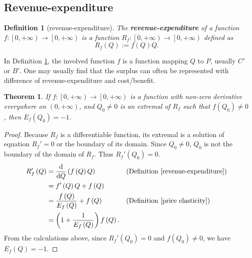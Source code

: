 \documentclass{article}
\newtheorem{theorem}{Theorem}[subsection]
\newtheorem{definition}{Definition}[subsection]
\begin{document}
\subsection{Revenue-expenditure}

\begin{definition}[revenue-expenditure]
\label{revenue-expenditure}
The \textbf{revenue-expenditure} of a function $f:\left[0,+\infty\right)\to\left[0,+\infty\right)$ is a function $R_f:\left[0,+\infty\right)\to\left[0,+\infty\right)$ defined as
$$R_f\left(Q\right):=f\left(Q\right)Q.$$
\end{definition}

In Definition \ref{revenue-expenditure}, the involved function $f$ is a function mapping $Q$ to $P$, usually $C'$ or $B'$.
One may usually find that the surplus can often be represented with difference of revenue-expenditure and cost/benefit.

\begin{theorem}
\label{price elasticity and revenue-expenditure}
If $f:\left[0,+\infty\right)\to\left[0,+\infty\right)$ is a function with non-zero derivative everywhere on $\left(0,+\infty\right)$, and $Q_0\ne0$ is an extremal of $R_f$ such that $f\left(Q_0\right)\ne0$, then $E_f\left(Q_0\right)=-1$.
\end{theorem}
\begin{proof}
Because $R_f$ is a differentiable function, its extremal is a solution of equation $R_f'=0$ or the boundary of its domain.
Since $Q_0\ne0$, $Q_0$ is{} not the boundary of the domain of $R_f$.
Thus $R_f'\left(Q_0\right)=0$.
\begin{align*}
R_f'\left(Q\right)&=\frac{\mathrm d}{\mathrm dQ}\left(f\left(Q\right)Q\right)&&\text{(Definition \ref{revenue-expenditure})}\\
&=f'\left(Q\right)Q+f\left(Q\right)\\
&=\frac{f\left(Q\right)}{E_f\left(Q\right)}+f\left(Q\right)&&\text{(Definition \ref{price elasticity})}\\
&=\left(1+\frac1{E_f\left(Q\right)}\right)f\left(Q\right).
\end{align*}
From the calculations above, since $R_f'\left(Q_0\right)=0$ and $f\left(Q_0\right)\ne0$, we have $E_f\left(Q\right)=-1$.
\end{proof}
\end{document}
